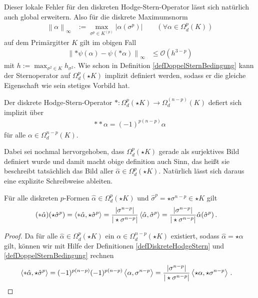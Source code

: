   Dieser lokale Fehler für den diskreten Hodge-Stern-Operator lässt sich natürlich auch global erweitern.
  Also für die diskrete Maximumsnorm
  \begin{align}
    \left\| \alpha \right\|_{\infty} &:= \max_{\sigma^{p}\in K^{(p)}}\left| \alpha(\sigma^{p}) \right| \qquad (\forall\alpha\in\Omega^{p}_{d}(K))
  \end{align}
  auf dem Primärgitter \( K \) gilt im obigen Fall
  \begin{align}
    \left\| *\psi(\alpha) - \psi(*\alpha) \right\|_{\infty} &\le \mathcal{O}\left(h^{3-p}\right)
  \end{align}
  mit \( h:=\max_{\sigma^{2}\in K} h_{\sigma^{2}} \).
  Wie schon in Definition \ref{defDoppelSternBedingung} kann der Sternoperator auf \( \Omega^{p}_{d}(\star K) \) implizit definiert werden,
  sodass er die gleiche Eigenschaft wie sein stetiges Vorbild hat.

  \begin{definition}
    \label{defDualHodgeStern}
    Der diskrete Hodge-Stern-Operator \(*:\Omega^{p}_{d}(\star K) \rightarrow \Omega^{(n-p)}_{d}(K)\) defiert sich implizit über
    \begin{align}
      **\alpha = (-1)^{p(n-p)}\alpha
    \end{align}
    für alle \( \alpha\in\Omega^{n-p}_{d}(K) \).
  \end{definition}

  Dabei sei nochmal hervorgehoben, dass \(\Omega^{p}_{d}(\star K)  \) gerade als surjektives Bild definiert wurde und damit macht obige definition auch Sinn,
  das heißt sie beschreibt tatsächlich das Bild aller \( \hat\alpha\in\Omega^{p}_{d}(\star K) \).
  Natürlich lässt sich daraus eine explizite Schreibweise ableiten.
  
  \begin{folgerung}
    Für alle diskreten \( p \)-Formen \( \hat\alpha\in\Omega^{p}_{d}(\star K) \) und \( \hat\sigma^{p}=\star\sigma^{n-p}\in\star K \) gilt
    \begin{align}
      (*\hat\alpha)(\star\hat\sigma^{p}) &= \left\langle *\hat\alpha, \star\hat\sigma^{p} \right\rangle 
                                        = \frac{|\sigma^{n-p}|}{|\star\sigma^{n-p}|} \left\langle \hat\alpha, \hat\sigma^{p} \right\rangle
                                         = \frac{|\sigma^{n-p}|}{|\star\sigma^{n-p}|} \hat\alpha(\hat\sigma^{p}) \,\text{.}
    \end{align}
  \end{folgerung}
  \begin{proof}
    Da für alle \( \hat\alpha\in\Omega^{p}_{d}(\star K) \) ein \( \alpha\in\Omega^{n-p}_{d}(\star K) \) existiert,
    sodass \( \hat\alpha = \star\alpha \) gilt, können wir mit Hilfe der Definitionen \ref{defDiskreteHodgeStern} und \ref{defDoppelSternBedingung} rechnen
    \begin{align}
      \left\langle *\hat\alpha, \star\hat\sigma^{p} \right\rangle
        &= (-1)^{p(n-p)} (-1)^{p(n-p)} \left\langle \alpha , \sigma^{n-p} \right\rangle
         = \frac{|\sigma^{n-p}|}{|\star\sigma^{n-p}|} \left\langle \star\alpha, \star\sigma^{n-p} \right\rangle \,\text{.}
    \end{align}
  \end{proof}
  
